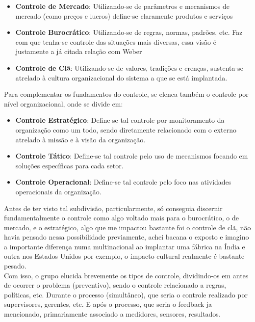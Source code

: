 \documentclass[oneside]{book}
\newcommand\tab[1][1cm]{\hspace*{#1}}
\theoremstyle{definition}
\begin{document}
            \begin{itemize}
                \item \textbf{Controle de Mercado}: Utilizando-se de parâmetros e mecanismos de mercado (como preços e lucros) define-se claramente produtos e serviços
                \item \textbf{Controle Burocrático}: Utilizando-se de regras, normas, padrões, etc. Faz com que tenha-se controle das situações mais diversas, essa visão é justamente a já citada relação com Weber
                \item \textbf{Controle de Clã}: Utilizando-se de valores, tradições e crenças, sustenta-se atrelado à cultura organizacional do sistema a que se está implantada.
            \end{itemize}
            \tab Para complementar os fundamentos do controle, se elenca também o controle por nível organizacional, onde se divide em:
            \begin{itemize}
                \item \textbf{Controle Estratégico}: Define-se tal controle por monitoramento da organização como um todo, sendo diretamente relacionado com o externo atrelado à missão e à visão da organização.
                \item \textbf{Controle Tático}: Define-se tal controle pelo uso de mecanismos focando em soluções específicas para cada setor.
                \item \textbf{Controle Operacional}: Define-se tal controle pelo foco nas atividades operacionais da organização.
            \end{itemize}
            \tab Antes de ter visto tal subdivisão, particularmente, só conseguia discernir fundamentalmente o controle como algo voltado mais para o burocrático, o de mercado, e o estratégico, algo que me impactou bastante foi o controle de clã, não havia pensado nessa possibilidade previamente, achei bacana o exposto e imagino a importante diferença numa multinacional ao implantar uma fábrica na Índia e outra nos Estados Unidos por exemplo, o impacto cultural realmente é bastante pesado.\\
            \tab Com isso, o grupo elucida brevemente os tipos de controle, dividindo-os em antes de ocorrer o problema (preventivo), sendo o controle relacionado a regras, políticas, etc. Durante o processo (simultâneo), que seria o controle realizado por supervisores, gerentes, etc. E após o processo, que seria o feedback ja mencionado, primariamente associado a medidores, sensores, resultados.\\
\end{document}
